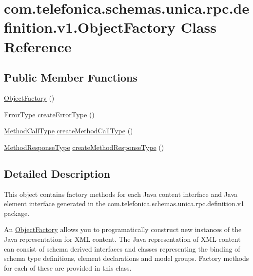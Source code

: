 \hypertarget{classcom_1_1telefonica_1_1schemas_1_1unica_1_1rpc_1_1definition_1_1v1_1_1ObjectFactory}{
\section{com.telefonica.schemas.unica.rpc.definition.v1.ObjectFactory Class Reference}
\label{classcom_1_1telefonica_1_1schemas_1_1unica_1_1rpc_1_1definition_1_1v1_1_1ObjectFactory}
}
\subsection*{Public Member Functions}
\begin{DoxyCompactItemize}
\item 
\hyperlink{classcom_1_1telefonica_1_1schemas_1_1unica_1_1rpc_1_1definition_1_1v1_1_1ObjectFactory_afa3f07fbbede4c8458564995fee9a891}{ObjectFactory} ()
\item 
\hyperlink{classcom_1_1telefonica_1_1schemas_1_1unica_1_1rpc_1_1definition_1_1v1_1_1ErrorType}{ErrorType} \hyperlink{classcom_1_1telefonica_1_1schemas_1_1unica_1_1rpc_1_1definition_1_1v1_1_1ObjectFactory_a98d11d3a826f3e5e406784d762f7fde1}{createErrorType} ()
\item 
\hyperlink{classcom_1_1telefonica_1_1schemas_1_1unica_1_1rpc_1_1definition_1_1v1_1_1MethodCallType}{MethodCallType} \hyperlink{classcom_1_1telefonica_1_1schemas_1_1unica_1_1rpc_1_1definition_1_1v1_1_1ObjectFactory_a9f83790a24df9d1eaaca71cbbd2b4a7e}{createMethodCallType} ()
\item 
\hyperlink{classcom_1_1telefonica_1_1schemas_1_1unica_1_1rpc_1_1definition_1_1v1_1_1MethodResponseType}{MethodResponseType} \hyperlink{classcom_1_1telefonica_1_1schemas_1_1unica_1_1rpc_1_1definition_1_1v1_1_1ObjectFactory_aef8adce73d46a461c9275da8c9275c32}{createMethodResponseType} ()
\end{DoxyCompactItemize}


\subsection{Detailed Description}
This object contains factory methods for each Java content interface and Java element interface generated in the com.telefonica.schemas.unica.rpc.definition.v1 package. 

An \hyperlink{classcom_1_1telefonica_1_1schemas_1_1unica_1_1rpc_1_1definition_1_1v1_1_1ObjectFactory}{ObjectFactory} allows you to programatically construct new instances of the Java representation for XML content. The Java representation of XML content can consist of schema derived interfaces and classes representing the binding of schema type definitions, element declarations and model groups. Factory methods for each of these are provided in this class. 


